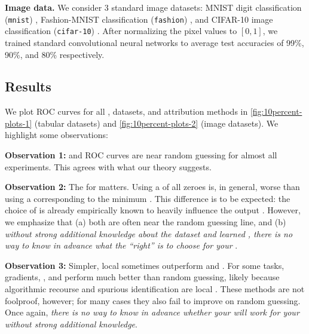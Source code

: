 \textbf{Image data.} We consider 3 standard image datasets: MNIST digit classification (\texttt{mnist}) \citep{lecun2010mnist}, Fashion-MNIST classification (\texttt{fashion}) \citep{xiao17fashion}, and CIFAR-10 image classification (\texttt{cifar-10}) \citep{Krizhevsky09learningmultiple}.
After normalizing the pixel values to $[0,1]$, we trained standard convolutional neural networks to average test accuracies of 99\%, 90\%, and 80\% respectively.


%
%
%
%
%
%
%

%
%
%
%
%
%
%
%
%
%
%
%

%
%

%




\subsection{Results}

We plot ROC curves for all \downtasknames{}, datasets, and attribution methods in \cref{fig:10percent-plots-1} (tabular datasets) and \cref{fig:10percent-plots-2} (image datasets).
We highlight some observations:

\textbf{Observation 1:}
\shap{} and \intgrad{} ROC curves are near random guessing for almost all experiments. This agrees with what our theory suggests.

\textbf{Observation 2:}
The \basename{} for \intgradshort{} matters.
Using a \basename{} of all zeroes is, in general, worse than using a \basename{} corresponding to the minimum \covnames{}.
This difference is to be expected: the choice of \basename{} is already empirically known to heavily influence the output \citep{sturmfels2020visualizing}.
However, we emphasize that (a) both \basenames{} are often near the random guessing line, and (b) \emph{without strong additional knowledge about the dataset and learned \modelname{}, there is no way to know in advance what the ``right'' \basename{} is to choose for your \taskname{}}.

\textbf{Observation 3:}
Simpler, local \fielddefnames{} sometimes outperform \shap{} and \intgradshort{}.  
For some tasks, gradients, \smoothgrad{}, and \lime{} perform much better than random guessing, likely because algorithmic recourse and spurious \covname{} identification are local \downtasknames{}.
These methods are not foolproof, however; for many cases they also fail to improve on random guessing.
Once again, \emph{there is no way to know in advance whether your \fielddefname{} will work for your \taskname{} without strong additional knowledge}.


